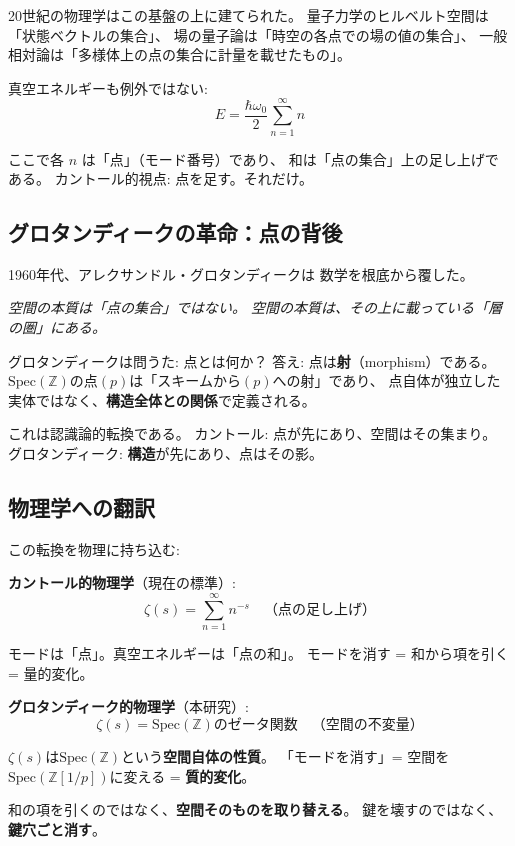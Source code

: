 \documentclass[11pt,a4paper]{article}
\newcommand{\Spec}{\mathrm{Spec}}
\newcommand{\Zp}{\mathbb{Z}[1/p]}
\begin{document}
20世紀の物理学はこの基盤の上に建てられた。
量子力学のヒルベルト空間は「状態ベクトルの集合」、
場の量子論は「時空の各点での場の値の集合」、
一般相対論は「多様体上の点の集合に計量を載せたもの」。

真空エネルギーも例外ではない:
$$E = \frac{\hbar\omega_0}{2}\sum_{n=1}^{\infty} n$$

ここで各 $n$ は「点」（モード番号）であり、
和は「点の集合」上の足し上げである。
カントール的視点: 点を足す。それだけ。

\subsection{グロタンディークの革命：点の背後}

1960年代、アレクサンドル・グロタンディークは
数学を根底から覆した。

\begin{epigraph}
\textit{空間の本質は「点の集合」ではない。
空間の本質は、その上に載っている「層の圏」にある。}
\end{epigraph}

グロタンディークは問うた: 点とは何か？
答え: 点は\textbf{射}（morphism）である。
$\Spec(\mathbb{Z})$の点$(p)$は「スキームから$(p)$への射」であり、
点自体が独立した実体ではなく、\textbf{構造全体との関係}で定義される。

これは認識論的転換である。
カントール: 点が先にあり、空間はその集まり。
グロタンディーク: \textbf{構造}が先にあり、点はその影。

\subsection{物理学への翻訳}

この転換を物理に持ち込む:

\textbf{カントール的物理学}（現在の標準）:
$$\zeta(s) = \sum_{n=1}^{\infty} n^{-s} \quad \text{（点の足し上げ）}$$

モードは「点」。真空エネルギーは「点の和」。
モードを消す = 和から項を引く = 量的変化。

\textbf{グロタンディーク的物理学}（本研究）:
$$\zeta(s) = \text{$\Spec(\mathbb{Z})$のゼータ関数} \quad \text{（空間の不変量）}$$

$\zeta(s)$は$\Spec(\mathbb{Z})$という\textbf{空間自体の性質}。
「モードを消す」= 空間を$\Spec(\Zp)$に変える = \textbf{質的変化}。

和の項を引くのではなく、\textbf{空間そのものを取り替える}。
鍵を壊すのではなく、\textbf{鍵穴ごと消す}。
\end{document}
